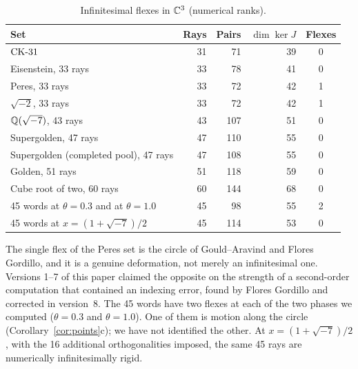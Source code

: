 \begin{table}[t]
\centering
\caption{Infinitesimal flexes in $\mathbb{C}^3$ (numerical ranks).}
\label{tab:rigidity}
\begin{tabular}{lrrrc}
\toprule
Set & Rays & Pairs & $\dim\ker J$ & Flexes \\
\midrule
$\mathrm{CK}\text{-}31$ & 31 & 71 & 39 & 0 \\
Eisenstein, 33 rays & 33 & 78 & 41 & 0 \\
Peres, 33 rays & 33 & 72 & 42 & 1 \\
$\sqrt{-2}$, 33 rays & 33 & 72 & 42 & 1 \\
$\mathbb{Q}(\sqrt{-7})$, 43 rays & 43 & 107 & 51 & 0 \\
Supergolden, 47 rays & 47 & 110 & 55 & 0 \\
Supergolden (completed pool), 47 rays & 47 & 108 & 55 & 0 \\
Golden, 51 rays & 51 & 118 & 59 & 0 \\
Cube root of two, 60 rays & 60 & 144 & 68 & 0 \\
45 words at $\theta=0.3$ and at $\theta=1.0$ & 45 & 98 & 55 & 2 \\
45 words at $x=(1+\sqrt{-7})/2$ & 45 & 114 & 53 & 0 \\
\bottomrule
\end{tabular}
\end{table}

The single flex of the Peres set is the circle of Gould--Aravind and Flores Gordillo, and it is a
genuine deformation, not merely an infinitesimal one.  Versions 1--7 of this paper claimed the
opposite on the strength of a second-order computation that contained an indexing error, found
by Flores Gordillo and corrected in version~8.  The 45 words have two flexes at each of the two phases we computed
($\theta=0.3$ and $\theta=1.0$).  One of them is motion along the circle
(Corollary~\ref{cor:points}c); we have not identified the other.  At $x=(1+\sqrt{-7})/2$, with
the 16 additional orthogonalities imposed, the same 45 rays are numerically infinitesimally
rigid.

